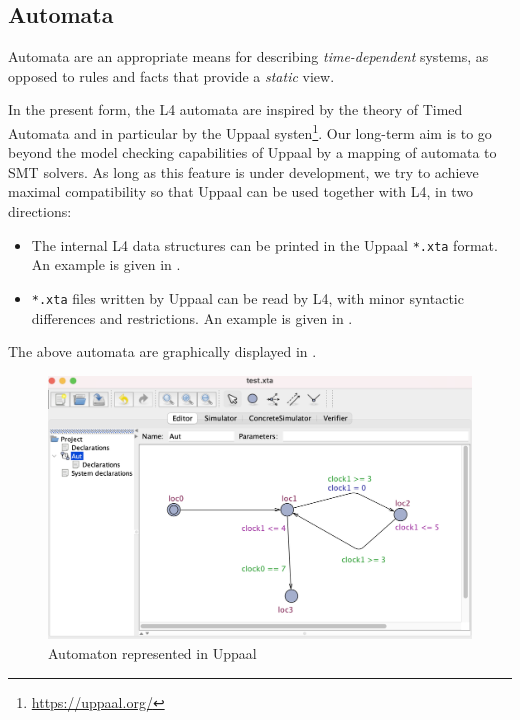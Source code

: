 
\subsection{Automata}\label{sec:automata}

Automata are an appropriate means for describing \emph{time-dependent} systems, as
opposed to rules and facts that provide a \emph{static} view.

In the present form, the L4 automata are inspired by the theory of Timed
Automata \cite{larsen1997uppaal} and in particular by the Uppaal
systen\footnote{\url{https://uppaal.org/}}. Our long-term aim is to go beyond the model
checking capabilities of Uppaal by a mapping of automata to SMT solvers. As
long as this feature is under development, we try to achieve maximal
compatibility so that Uppaal can be used together with L4, in two directions:

\begin{itemize}
\item The internal L4 data structures can be printed in the Uppaal
  \texttt{*.xta} format. An example is given in .
\item \texttt{*.xta} files written by Uppaal can be read by L4, with minor
  syntactic differences and restrictions. An example is given in .
\end{itemize}
The above automata are graphically displayed in .

\begin{figure}
\centering
\includegraphics[scale=0.4]{Figures/uppaal_automaton.png}
\caption{Automaton represented in Uppaal}\label{fig:uppaal_automaton}
\end{figure}


